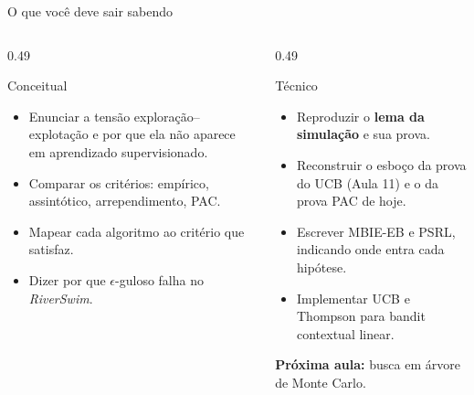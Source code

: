 \documentclass[aspectratio=169, 11pt]{beamer}
\begin{document}
\begin{frame}{O que você deve sair sabendo}
  \begin{columns}[T]
    \begin{column}{0.49\textwidth}
      \begin{defbox}{Conceitual}
        \begin{itemize}
          \item Enunciar a tensão exploração--explotação e por que ela não aparece em
                aprendizado supervisionado.
          \item Comparar os critérios: empírico, assintótico, arrependimento, PAC.
          \item Mapear cada algoritmo ao critério que satisfaz.
          \item Dizer por que $\epsilon$-guloso falha no \textit{RiverSwim}.
        \end{itemize}
      \end{defbox}
    \end{column}
    \begin{column}{0.49\textwidth}
      \begin{defbox}{Técnico}
        \begin{itemize}
          \item Reproduzir o \textbf{lema da simulação} e sua prova.
          \item Reconstruir o esboço da prova do UCB (Aula 11) e o da prova PAC de hoje.
          \item Escrever MBIE-EB e PSRL, indicando onde entra cada hipótese.
          \item Implementar UCB e Thompson para bandit contextual linear.
        \end{itemize}
      \end{defbox}
      {\small\color{rlCinza}\textbf{Próxima aula:} busca em árvore de Monte Carlo.}
    \end{column}
  \end{columns}
\end{frame}
\end{document}
